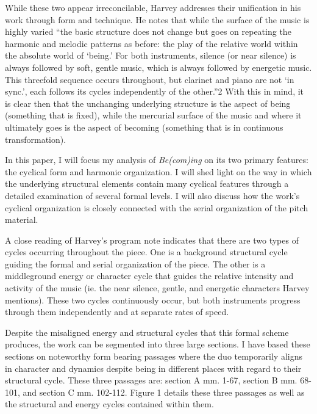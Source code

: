While these two appear irreconcilable, Harvey addresses their unification in his work through form and technique. He notes that while the surface of the music is highly varied ``the basic structure does not change but goes on repeating the harmonic and melodic patterns as before: the play of the relative world within the absolute world of ‘being.’ For both instruments, silence (or near silence) is always followed by soft, gentle music, which is always followed by energetic music. This threefold sequence occurs throughout, but clarinet and piano are not ‘in sync.’, each follows its cycles independently of the other.''2 With this in mind, it is clear then that the unchanging underlying structure is the aspect of being (something that is fixed), while the mercurial surface of the music and where it ultimately goes is the aspect of becoming (something that is in continuous transformation).

In this paper, I will focus my analysis of \emph{Be(com)ing} on its two primary features: the cyclical form and harmonic organization. I will shed light on the way in which the underlying structural elements contain many cyclical features through a detailed examination of several formal levels. I will also discuss how the work's cyclical organization is closely connected with the serial organization of the pitch material.

A close reading of Harvey's program note indicates that there are two types of cycles occurring throughout the piece. One is a background structural cycle guiding the formal and serial organization of the piece. The other is a middleground energy or character cycle that guides the relative intensity and activity of the music (ie. the near silence, gentle, and energetic characters Harvey mentions). These two cycles continuously occur, but both instruments progress through them independently and at separate rates of speed.

Despite the misaligned energy and structural cycles that this formal scheme produces, the work can be segmented into three large sections. I have based these sections on noteworthy form bearing passages where the duo temporarily aligns in character and dynamics despite being in different places with regard to their structural cycle. These three passages are: section A mm. 1-67, section B mm. 68-101, and section C mm. 102-112. Figure 1 details these three passages as well as the structural and energy cycles contained within them.

